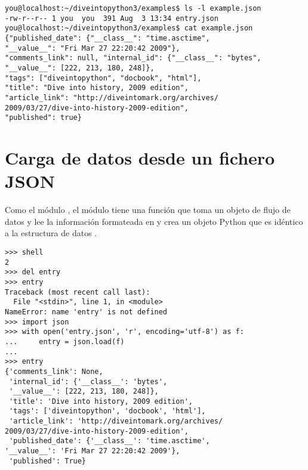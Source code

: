 \noindent\begin{minipage}{\textwidth}
\begin{lstlisting}[mathescape=False]
you@localhost:~/diveintopython3/examples$ ls -l example.json
-rw-r--r-- 1 you  you  391 Aug  3 13:34 entry.json
you@localhost:~/diveintopython3/examples$ cat example.json
{"published_date": {"__class__": "time.asctime", 
"__value__": "Fri Mar 27 22:20:42 2009"},
"comments_link": null, "internal_id": {"__class__": "bytes", 
"__value__": [222, 213, 180, 248]},
"tags": ["diveintopython", "docbook", "html"], 
"title": "Dive into history, 2009 edition",
"article_link": "http://diveintomark.org/archives/
2009/03/27/dive-into-history-2009-edition",
"published": true}
\end{lstlisting}
\end{minipage}

\section{Carga de datos desde un fichero JSON}

Como el módulo , el módulo  tiene una función  que toma un objeto de flujo de datos y lee la información formateada en  y crea un objeto Python que es idéntico a la estructura de datos .

\noindent\begin{minipage}{\textwidth}
\begin{lstlisting}[mathescape=True]
>>> shell
2
>>> del entry 
>>> entry
Traceback (most recent call last):
  File "<stdin>", line 1, in <module>
NameError: name 'entry' is not defined
>>> import json
>>> with open('entry.json', 'r', encoding='utf-8') as f:
...     entry = json.load(f)
... 
>>> entry                  
{'comments_link': None,
 'internal_id': {'__class__': 'bytes', 
 '__value__': [222, 213, 180, 248]},
 'title': 'Dive into history, 2009 edition',
 'tags': ['diveintopython', 'docbook', 'html'],
 'article_link': 'http://diveintomark.org/archives/
2009/03/27/dive-into-history-2009-edition',
 'published_date': {'__class__': 'time.asctime', 
'__value__': 'Fri Mar 27 22:20:42 2009'},
 'published': True}
\end{lstlisting}
\end{minipage}

